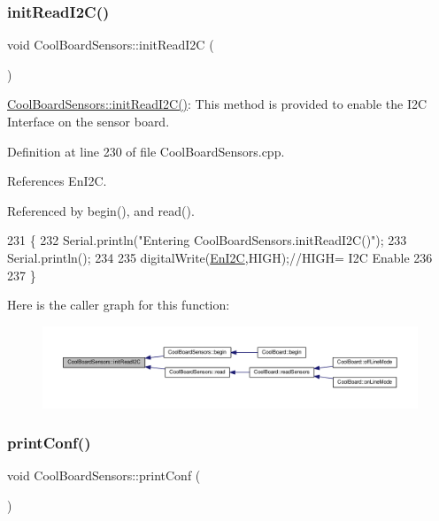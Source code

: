 \subsubsection{\texorpdfstring{init\+Read\+I2\+C()}{initReadI2C()}}
{\footnotesize\ttfamily void Cool\+Board\+Sensors\+::init\+Read\+I2C (\begin{DoxyParamCaption}{ }\end{DoxyParamCaption})}

\hyperlink{classCoolBoardSensors_acad6a8418c66d36868caca23c844ecb6}{Cool\+Board\+Sensors\+::init\+Read\+I2\+C()}\+: This method is provided to enable the I2C Interface on the sensor board. 

Definition at line 230 of file Cool\+Board\+Sensors.\+cpp.



References En\+I2C.



Referenced by begin(), and read().


\begin{DoxyCode}
231 \{
232     Serial.println(\textcolor{stringliteral}{"Entering CoolBoardSensors.initReadI2C()"});
233     Serial.println();
234  
235     digitalWrite(\hyperlink{classCoolBoardSensors_aaa6b5dbf3a6633bffd9d204d961096dc}{EnI2C},HIGH);\textcolor{comment}{//HIGH= I2C Enable}
236 
237 \}
\end{DoxyCode}
Here is the caller graph for this function\+:\nopagebreak
\begin{figure}[H]
\begin{center}
\leavevmode
\includegraphics[width=350pt]{classCoolBoardSensors_acad6a8418c66d36868caca23c844ecb6_icgraph}
\end{center}
\end{figure}
\mbox{\label{classCoolBoardSensors_af6fd79505815b204c178617ecf54c873}} 
\subsubsection{\texorpdfstring{print\+Conf()}{printConf()}}
{\footnotesize\ttfamily void Cool\+Board\+Sensors\+::print\+Conf (\begin{DoxyParamCaption}{ }\end{DoxyParamCaption})}

